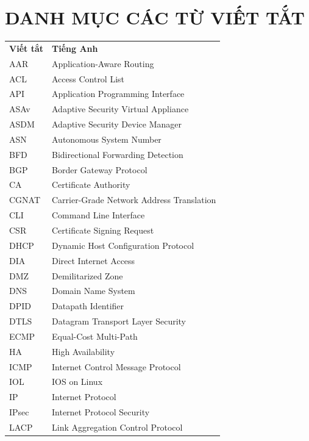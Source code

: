 \newpage
\section*{DANH MỤC CÁC TỪ VIẾT TẮT}

{
\renewcommand{\arraystretch}{1.3} %
\begin{longtable}{ >{\centering\arraybackslash}p{3cm} p{9cm} }
    \textbf{Viết tắt} & \textbf{Tiếng Anh} \\

    AAR & Application-Aware Routing \\
    ACL & Access Control List \\
    API & Application Programming Interface \\
    ASAv & Adaptive Security Virtual Appliance \\
    ASDM & Adaptive Security Device Manager \\
    ASN & Autonomous System Number \\
    BFD & Bidirectional Forwarding Detection \\
    BGP & Border Gateway Protocol \\
    CA & Certificate Authority \\
    CGNAT & Carrier-Grade Network Address Translation \\
    CLI & Command Line Interface \\
    CSR & Certificate Signing Request \\
    DHCP & Dynamic Host Configuration Protocol \\
    DIA & Direct Internet Access \\
    DMZ & Demilitarized Zone \\
    DNS & Domain Name System \\
    DPID & Datapath Identifier \\
    DTLS & Datagram Transport Layer Security \\
    ECMP & Equal-Cost Multi-Path \\
    HA & High Availability \\
    ICMP & Internet Control Message Protocol \\
    IOL & IOS on Linux \\
    IP & Internet Protocol \\
    IPsec & Internet Protocol Security \\
    LACP & Link Aggregation Control Protocol \\

\end{longtable}}
